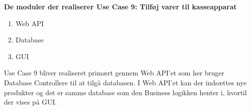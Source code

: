 \textbf{De moduler der realiserer Use Case 9: Tilføj varer til kasseapparat}

\begin{enumerate}
	\item Web API
	\item Database
	\item GUI
\end{enumerate}

Use Case 9 bliver realiseret primært gennem Web API'et som her bruger Database Controllere til at tilgå databasen. I Web API'et kan der indsættes nye produkter og det er samme database som den Business logikken henter i, hvortil der vises på GUI.
